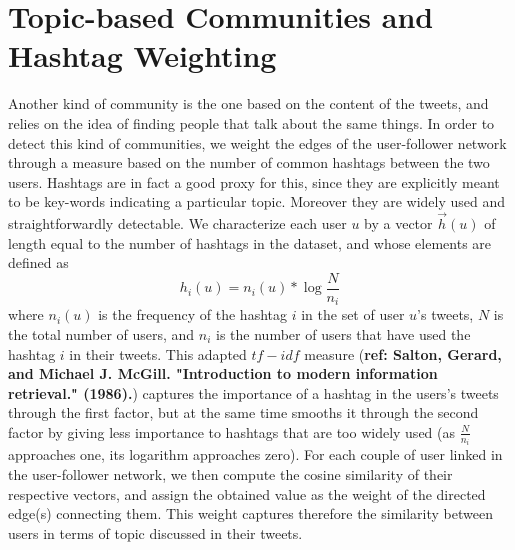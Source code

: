 \section{Topic-based Communities and Hashtag Weighting}

Another kind of community is the one based on the content of the tweets, and relies on the idea of finding people that talk about the same things. In order to detect this kind of communities, we weight the edges of the user-follower network through a measure based on the number of common hashtags between the two users. Hashtags are in fact a good proxy for this, since they are explicitly meant to be key-words indicating a particular topic. Moreover they are widely used and straightforwardly detectable. We characterize each user $u$ by a vector $\vec{h}(u)$ of length equal to the number of hashtags in the dataset, and whose elements are defined as
\begin{equation}
h_i(u) = n_i(u) * \log{ \frac{N}{n_i} }
\end{equation}
where $n_i(u)$ is the frequency of the hashtag $i$ in the set of user $u$'s tweets, $N$ is the total number of users, and $n_i$ is the number of users that have used the hashtag $i$ in their tweets. This adapted $tf-idf$ measure (\textbf{ref: Salton, Gerard, and Michael J. McGill. "Introduction to modern information retrieval." (1986).}) captures the importance of a hashtag in the users's tweets through the first factor, but at the same time smooths it through the second factor by giving less importance to hashtags that are too widely used (as $\frac{N}{n_i}$ approaches one, its logarithm approaches zero). For each couple of user linked in the user-follower network, we then compute the cosine similarity of their respective vectors, and assign the obtained value as the weight of the directed edge(s) connecting them. This weight captures therefore the similarity between users in terms of topic discussed in their tweets.